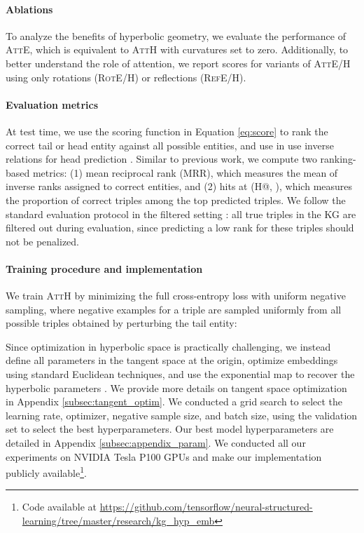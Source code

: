 \documentclass[11pt,a4paper]{article}
\newcommand{\kg}{\textsc{KG}{}}
\newcommand{\model}[1]{\textsc{AttH}}
\begin{document}
\paragraph{Ablations} 
To analyze the benefits of hyperbolic geometry, we evaluate the performance of \textsc{AttE}, which is equivalent to \model{} with curvatures set to zero.
Additionally, to better understand the role of attention, we report scores for variants of \textsc{AttE}/\textsc{H} using only rotations (\textsc{RotE}/\textsc{H}) or reflections (\textsc{RefE}/\textsc{H}).

\paragraph{Evaluation metrics} 
At test time, we use the scoring function in Equation \ref{eq:score} to rank the correct tail or head entity against all possible entities, and use in use inverse relations for head prediction \cite{lacroix2018canonical}.
Similar to previous work, we compute two ranking-based metrics: (1) mean reciprocal rank (MRR), which measures the mean of inverse ranks assigned to correct entities, and (2) hits at  (H@,  ), which measures the proportion of correct triples among the top  predicted triples. 
We follow the standard evaluation protocol in the filtered setting \cite{bordes2013translating}: all true triples in the \kg{} are filtered out during evaluation, since predicting a low rank for these triples should not be penalized. 

\paragraph{Training procedure and implementation} 
We train \model{} by minimizing the full cross-entropy loss with uniform negative sampling, where negative examples for a triple  are sampled uniformly from all possible triples obtained by perturbing the tail entity:   

Since optimization in hyperbolic space is practically challenging, we instead define all parameters in the tangent space at the origin, optimize embeddings using standard Euclidean techniques, and use the exponential map to recover the hyperbolic parameters \cite{chami2019hyperbolic}. 
We provide more details on tangent space optimization in Appendix \ref{subsec:tangent_optim}. 
We conducted a grid search to select the learning rate, optimizer, negative sample size, and batch size, using the validation set to select the best hyperparameters.
Our best model hyperparameters are detailed in Appendix \ref{subsec:appendix_param}. 
We conducted all our experiments on NVIDIA Tesla P100 GPUs and make our implementation publicly available\footnote{Code available at \url{https://github.com/tensorflow/neural-structured-learning/tree/master/research/kg_hyp_emb}}. 
 
\end{document}
